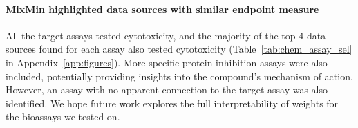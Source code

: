 \paragraph{MixMin highlighted data sources with similar endpoint measure} All the target assays tested cytotoxicity, and the majority of the top 4 data sources \method found for each assay also tested cytotoxicity (Table~\ref{tab:chem_assay_sel} in Appendix~\ref{app:figures}).  More specific protein inhibition assays were also included, potentially providing insights into the compound's mechanism of action. However, an assay with no apparent connection to the target assay was also identified. We hope future work explores the full interpretability of \method weights for the bioassays we tested on.


